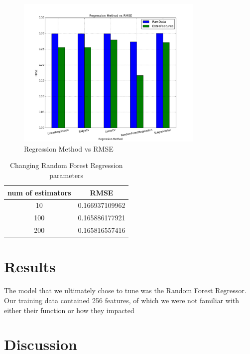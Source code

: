 \documentclass{article}
\begin{document}
\begin{figure}[h]
\centering
\includegraphics[width=0.8\textwidth]{method_selection}
\caption{Regression Method vs RMSE}
\label{fig:method_selection}
\end{figure}

\begin{center}
\begin{table}
\centering
\begin{tabular}{ |c|c| } 
 \hline
num of estimators & RMSE \\
 \hline
 10 &  0.166937109962 \\ 
 100 & 0.165886177921 \\ 
 200 & 0.165816557416 \\ 
 \hline
\end{tabular}
\caption{Changing Random Forest Regression parameters}
\label{table:1}
\end{table}
\end{center}

\section{Results}
The model that we ultimately chose to tune was the Random Forest Regressor. Our training data contained 256 features, of which we were not familiar with either their function or how they impacted
\section{Discussion}
\end{document}
